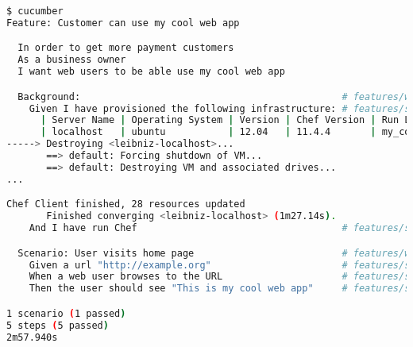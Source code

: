 \begin{lstlisting}[language=Bash,label=lst:testing-cucumber-spec1]
$ cucumber
Feature: Customer can use my cool web app

  In order to get more payment customers
  As a business owner
  I want web users to be able use my cool web app

  Background:                                              # features/working_web_page.feature:7
    Given I have provisioned the following infrastructure: # features/step_definitions/working_web_page.rb:1
      | Server Name | Operating System | Version | Chef Version | Run List             |
      | localhost   | ubuntu           | 12.04   | 11.4.4       | my_cool_app::default |
-----> Destroying <leibniz-localhost>...
       ==> default: Forcing shutdown of VM...
       ==> default: Destroying VM and associated drives...
...

Chef Client finished, 28 resources updated
       Finished converging <leibniz-localhost> (1m27.14s).
    And I have run Chef                                    # features/step_definitions/working_web_page.rb:5

  Scenario: User visits home page                          # features/working_web_page.feature:14
    Given a url "http://example.org"                       # features/step_definitions/working_web_page.rb:10
    When a web user browses to the URL                     # features/step_definitions/working_web_page.rb:14
    Then the user should see "This is my cool web app"     # features/step_definitions/working_web_page.rb:21

1 scenario (1 passed)
5 steps (5 passed)
2m57.940s
\end{lstlisting}